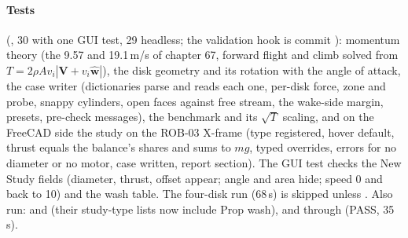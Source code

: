\paragraph{Tests} (, 30 with one GUI test, 29 headless; the validation hook is commit ): momentum theory (the 9.57 and 19.1\,m/s of chapter 67, forward
flight and climb solved from $T=2\rho Av_i|\mathbf V+v_i\hat{\mathbf w}|$), the disk geometry and its rotation with the
angle of attack, the case writer (dictionaries parse and  reads each one, per-disk force, zone and
probe, snappy cylinders, open faces against free stream, the wake-side margin, presets, pre-check messages), the
benchmark and its $\sqrt T$ scaling, and on the FreeCAD side the study on the ROB-03 X-frame (type registered, hover
default, thrust equals the balance's shares and sums to $mg$, typed overrides, errors for no diameter or no motor,
case written, report section). The GUI test checks the New Study fields (diameter, thrust, offset appear; angle and area hide; speed 0 and back to 10) and the wash table. The four-disk run (68\,s) is skipped unless . Also run:  and  (their study-type lists now include Prop wash),  and  through  (PASS, 35\,s).

